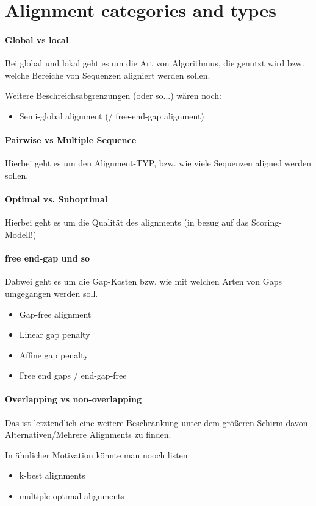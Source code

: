 
\section{Alignment categories and types}




\paragraph{Global vs local}
Bei global und lokal geht es um die Art von Algorithmus, die genutzt wird bzw. welche Bereiche von Sequenzen
aligniert werden sollen. \cite{tamang}

Weitere Beschreichsabgrenzungen (oder so...) wären noch:
\begin{itemize}
    \item Semi-global alignment (/ free-end-gap alignment)
\end{itemize}

\paragraph{Pairwise vs Multiple Sequence}
Hierbei geht es um den Alignment-TYP, bzw. wie viele Sequenzen aligned werden sollen. \cite{tamang}

\paragraph{Optimal vs. Suboptimal}
Hierbei geht es um die Qualität des alignments (in bezug auf das Scoring-Modell!)

\paragraph{free end-gap und so} Dabwei geht es um die Gap-Kosten bzw. wie mit welchen Arten von Gaps umgegangen
werden soll.
\begin{itemize}
    \item Gap-free alignment
    \item Linear gap penalty
    \item Affine gap penalty
    \item Free end gaps / end-gap-free
\end{itemize}

\paragraph{Overlapping vs non-overlapping}
Das ist letztendlich eine weitere Beschränkung unter dem größeren Schirm davon Alternativen/Mehrere Alignments zu
finden.

In ähnlicher Motivation könnte man nooch listen:
\begin{itemize}
    \item k-best alignments
    \item multiple optimal alignments
\end{itemize}



